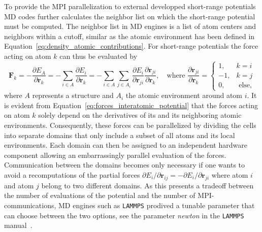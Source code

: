 To provide the MPI parallelization to external developped short-range potentials MD codes further calculates the neighbor list on which the short-range potential must be computed.
The neighbor list in MD engines is a list of atom centers and neighbors within a cutoff, similar as the atomic environment has been defined in Equation~\eqref{eq:density_atomic_contributions}.
For short-range potentials the force acting on atom $k$ can thus be evaluated by 
\begin{equation}
  \label{eq:forces_interatomic_potential}
  \mathbf{F}_k =  -\frac{\partial E_A}{\partial\mathbf{r}_k}
  = -\sum_{i\in A} \frac{\partial E_i}{\partial\mathbf{r}_k}
  = -\sum_{i\in A}\sum_{j\in A_i} \frac{\partial E_i}{\partial\mathbf{r}_{ji}} \frac{\partial\mathbf{r}_{ji}}{\partial\mathbf{r}_k}
   ,\quad\textrm{where }\frac{\partial\mathbf{r}_{ji}}{\partial\mathbf{r}_k} = \begin{cases}1,& k=i \\ -1,& k=j \\0,& \textrm{ else,} \end{cases}
\end{equation}
where $A$ represents a structure and $A_i$ the atomic environment around atom $i$.
It is evident from Equation~\eqref{eq:forces_interatomic_potential} that the forces acting on atom $k$ solely depend on the derivatives of its and its neighboring atomic environments.
Consequently, these forces can be parallelized by dividing the cells into separate domains that only include a subset of all atoms and its local environments.
Each domain can then be assigned to an independent hardware component allowing an embarrassingly parallel evaluation of the forces.
Communication between the domains becomes only necessary if one wants to avoid a recomputations of the partial forces $\partial E_i/\partial\mathbf{r}_{ij}=-\partial E_i/\partial\mathbf{r}_{ji}$ where atom $i$ and atom $j$ belong to two different domains.
As this presents a tradeoff between the number of evaluations of the potential and the number of MPI-communications, MD engines such as \texttt{LAMMPS} prodived a tunable parameter that can choose between the two options, see the parameter \emph{newton} in the \texttt{LAMMPS} manual~\cite{lammpsnewton}.
